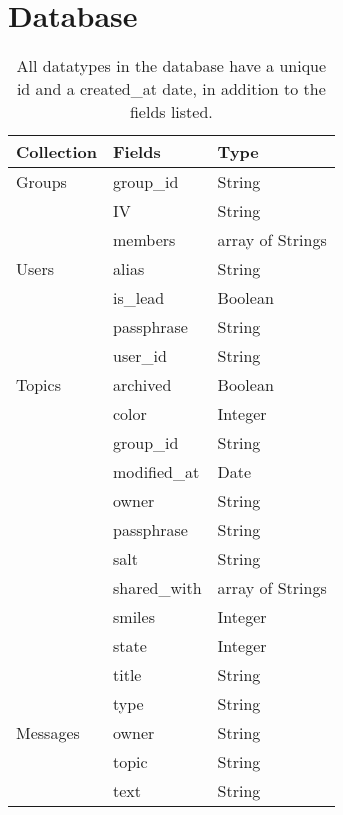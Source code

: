 \section{Database}
\label{sec:appb_data}
    \renewcommand{\arraystretch}{1.2}
    \begin{table}[H]
    \centering
    \begin{tabular}{  l  l  l }
    \hline
    Collection & Fields & Type \\
    \hline
    Groups
    & group\_id & String \\
    & IV & String \\
    & members & array of Strings \\
    \hline
    Users
    & alias & String \\
    & is\_lead & Boolean \\
    & passphrase & String \\
    & user\_id & String \\
    \hline
    Topics
    & archived & Boolean \\
    & color & Integer \\
    & group\_id & String \\
    & modified\_at & Date \\
    & owner & String \\
    & passphrase & String \\
    & salt & String \\
    & shared\_with & array of Strings \\
    & smiles & Integer \\
    & state & Integer \\
    & title & String \\
    & type & String \\
    \hline
    Messages
    & owner & String \\
    & topic & String \\
    & text & String \\
    \end{tabular}
    \caption[Datatypes in DB]{
    All datatypes in the database have a unique id and a created\_at date,
    in addition to the fields listed.}
    \label{fig:api_table}
    \end{table}

